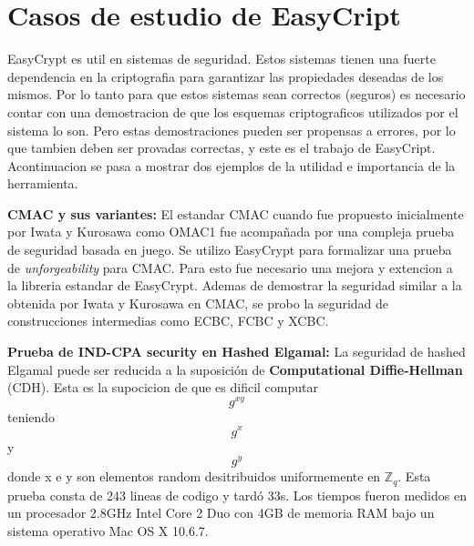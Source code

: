 \documentclass[runningheads]{llncs}
\begin{document}
\section{Casos de estudio de EasyCript}
EasyCrypt es util en sistemas de seguridad. Estos sistemas tienen una fuerte dependencia en la criptografia para garantizar las propiedades deseadas de los mismos. Por lo tanto para que estos sistemas sean correctos (seguros) es necesario contar con una demostracion de que los esquemas criptograficos utilizados por el sistema lo son. Pero estas demostraciones pueden ser propensas a errores, por lo que tambien deben ser provadas correctas, y este es el trabajo de EasyCript. Acontinuacion se pasa a mostrar dos ejemplos de la utilidad e importancia de la herramienta.

\textbf{CMAC y sus variantes\cite{ref_article5}:}
El estandar CMAC cuando fue propuesto inicialmente por Iwata y Kurosawa como OMAC1 fue acompañada por una compleja prueba de seguridad basada en juego. Se utilizo EasyCrypt para formalizar una prueba de \textit{unforgeability} para CMAC. Para esto fue necesario una mejora y extencion a la libreria estandar de EasyCrypt. Ademas de demostrar la seguridad similar a la obtenida por Iwata y Kurosawa\cite{ref_article6} en CMAC, se probo la seguridad de construcciones intermedias como ECBC, FCBC y XCBC\cite{ref_article7}.

\textbf{Prueba de \textbf{IND-CPA security} en Hashed Elgamal:}
La seguridad de hashed Elgamal puede ser reducida a la suposición de \textbf{Computational Diffie-Hellman} (CDH). Esta es la supocicion de que es dificil computar \begin{equation} g^{xy} \end{equation} teniendo \begin{equation} g^{x} \end{equation} y \begin{equation} g^{y} \end{equation} donde x e y son elementos random desitribuidos uniformemente  en $\mathbb{Z}_q$. Esta prueba consta de 243 lineas de codigo y tardó 33s. Los tiempos fueron medidos en un procesador 2.8GHz Intel Core 2 Duo con 4GB de memoria RAM bajo un sistema operativo Mac OS X 10.6.7.
\end{document}
